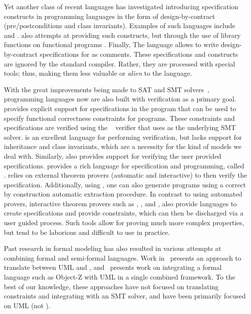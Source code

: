 Yet another class of recent languages has investigated introducing
specification constructs in programming languages in the form of
design-by-contract (pre/postconditions and class
invariants). Examples of such languages include \eiffel{}
\cite{eiffel} and \specsharp{} \cite{barnett2011specification}. 
\scala{} also
attempts at providing such constructs, but through the use of library
functions on functional programs \cite{odersky-rv10}. Finally, The
\jml{} language \cite{jml} allows to write design-by-contract
specifications for \java{} as comments. These specifications and
constructs are ignored by the standard \java{} compiler. Rather, they
are processed with special tools; thus, making them less valuable or
{\em alien} to the language.

With the great improvements being made to SAT and SMT
solvers~\cite{smt-lib,de2008z3}, programming languages now are also
built with verification as a primary goal. \dafny{}
\cite{leino-lpar-2010} provides explicit support for specifications in
the program that can be used to specify functional correctness
constraints for programs. These constraints and specifications are
verified using the \boogie{}~\cite{barnett2006boogie} verifier that
uses \zthree{} as the underlying SMT solver. \dafny{} is an excellent
language for performing verification, but lacks support for
inheritance and class invariants, which are a necessity for the kind
of models we deal with. Similarly, \specsharp{} also provides support
for verifying the user provided specifications. \whythree{}
\cite{filliatre-why3-2011} provides a rich language for specification
and programming, called \whyml{}. \whythree{} relies on external
theorem provers (automatic and interactive) to then verify the
specification. Additionally, using \whyml{}, one can also generate
\ocaml{} programs using a correct by construction automatic extraction
procedure. In contrast to using automated provers, interactive theorem
provers such as \pvs{} \cite{cade92-pvs,pvs-website}, \coq{}
\cite{coq-website}, and \isabelle{} \cite{isabelle-website}, also
provide languages to create specifications and provide constraints,
which can then be discharged via a user guided process. Such tools
allow for proving much more complex properties, but tend to be
laborious and difficult to use in practice.

Past research in formal modeling has also resulted in various attempts
at combining formal and semi-formal languages. Work
in~\cite{lausdahl2009connecting} presents an approach to translate
between UML and \vdmpp{}, and~\cite{kim2005mda} presents work on
integrating a formal language such as Object-Z with UML in a single
combined framework. To the best of our knowledge, these approaches
have not focused on translating constraints and integrating with an
SMT solver, and have been primarily focused on UML (not \sysml).

